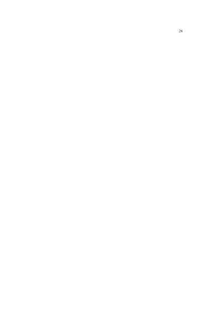 \begin{figure}[p]
	\centering 
	\includegraphics[scale=0.7]{capitulos/resolucoes/cuni414/cuni414-28.pdf}
\end{figure} \pagebreak

